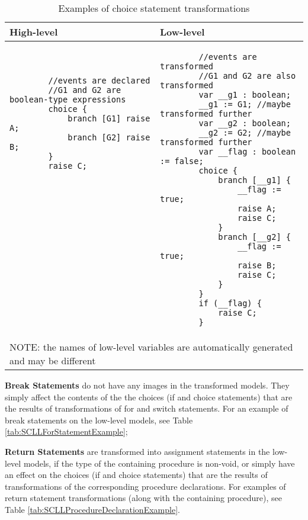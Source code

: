 \begin{table}[ht]
	\footnotesize
	\centering
	\begin{tabular}{ p{7cm} p{7cm} }
		\toprule
		High-level & Low-level \\
		\midrule
		\begin{lstlisting}
		//events are declared
		//G1 and G2 are boolean-type expressions
		choice {
			branch [G1] raise A;
			branch [G2] raise B;
		}
		raise C;
		
		
		
		
		
		
		
		
		
		
		
		
		
		
		\end{lstlisting} & 
		\begin{lstlisting}
		//events are transformed
		//G1 and G2 are also transformed
		var __g1 : boolean;
		__g1 := G1; //maybe transformed further
		var __g2 : boolean;
		__g2 := G2; //maybe transformed further
		var __flag : boolean := false;
		choice {
			branch [__g1] {
				__flag := true;
				raise A;
				raise C;
			}
			branch [__g2] {
				__flag := true;
				raise B;
				raise C;
			}
		}
		if (__flag) {
			raise C;
		}\end{lstlisting} \\
		\bottomrule
		\multicolumn{2}{l}{NOTE: the names of low-level variables are automatically generated and may be different}
	\end{tabular}
	\caption{Examples of choice statement transformations}
	\label{tab:SCLLChoiceStatementExample}
\end{table}

\bigskip
\textbf{Break Statements} do not have any images in the transformed models. They simply affect the contents of the the choices (if and choice statements) that are the results of transformations of for and switch statements. For an example of break statements on the low-level models, see Table \ref{tab:SCLLForStatementExample};

\bigskip
\textbf{Return Statements} are transformed into assignment statements in the low-level models, if the type of the containing procedure is non-void, or simply have an effect on the choices (if and choice statements) that are the results of transformations of the corresponding procedure declarations. For examples of return statement transformations (along with the containing procedure), see Table \ref{tab:SCLLProcedureDeclarationExample}.

